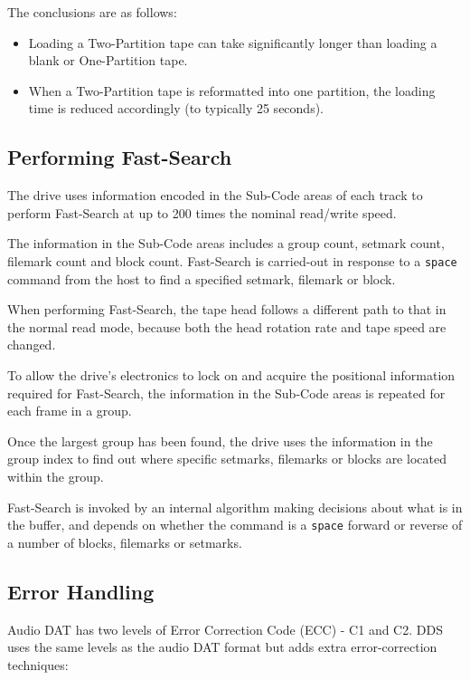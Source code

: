 \documentclass[11pt]{article}
\begin{document}
The conclusions are as follows:

\begin {itemize}

\item Loading a Two-Partition tape can take significantly longer than loading
a blank or One-Partition tape.

\item When a Two-Partition tape is reformatted into one partition, the
loading time is reduced accordingly (to typically 25 seconds).

\end {itemize}

\subsection {Performing Fast-Search}

The drive uses information encoded in the Sub-Code areas of each track to
perform Fast-Search at up to 200 times the nominal read/write speed.

The information in the Sub-Code areas includes a group count, setmark count,
filemark count and block count. Fast-Search is carried-out in response to a
{\tt space} command from the host to find a specified setmark, filemark or
block.

When performing Fast-Search, the tape head follows a different path to that
in the normal read mode, because both the head rotation rate and tape speed
are changed.

To allow the drive's electronics to lock on and acquire the positional
information required for Fast-Search, the information in the Sub-Code areas
is repeated for each frame in a group.

Once the largest group has been found, the drive uses the information in the
group index to find out where specific setmarks, filemarks or blocks are
located within the group.

Fast-Search is invoked by an internal algorithm making decisions about what
is in the buffer, and depends on whether the command is a {\tt space} forward
or reverse of a number of blocks, filemarks or setmarks.

\subsection {Error Handling}

Audio DAT has two levels of Error Correction Code (ECC) - C1 and C2. DDS
uses the same levels as the audio DAT format but adds extra error-correction
techniques:
\end{document}
